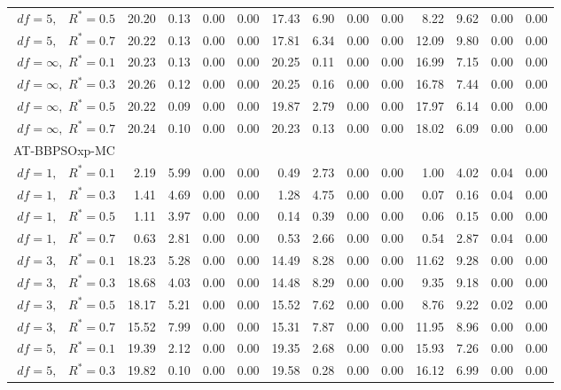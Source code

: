 \documentclass[12pt]{article}
\begin{document}
\begin{table}[ht]
{\begin{tabular}{r|rrrr|rrrr|rrrr}
  $df = 5,\enspace$ $R^* =0.5$ & 20.20 & 0.13 & 0.00 & 0.00 & 17.43 & 6.90 & 0.00 & 0.00 & 8.22 & 9.62 & 0.00 & 0.00 \\ 
  $df = 5,\enspace$ $R^* =0.7$ & 20.22 & 0.13 & 0.00 & 0.00 & 17.81 & 6.34 & 0.00 & 0.00 & 12.09 & 9.80 & 0.00 & 0.00 \\ 
  $df = \infty,$ $R^* =0.1$ & 20.23 & 0.13 & 0.00 & 0.00 & 20.25 & 0.11 & 0.00 & 0.00 & 16.99 & 7.15 & 0.00 & 0.00 \\ 
  $df = \infty,$ $R^* =0.3$ & 20.26 & 0.12 & 0.00 & 0.00 & 20.25 & 0.16 & 0.00 & 0.00 & 16.78 & 7.44 & 0.00 & 0.00 \\ 
  $df = \infty,$ $R^* =0.5$ & 20.22 & 0.09 & 0.00 & 0.00 & 19.87 & 2.79 & 0.00 & 0.00 & 17.97 & 6.14 & 0.00 & 0.00 \\ 
  $df = \infty,$ $R^* =0.7$ & 20.24 & 0.10 & 0.00 & 0.00 & 20.23 & 0.13 & 0.00 & 0.00 & 18.02 & 6.09 & 0.00 & 0.00 \\ 
\hline
\multicolumn{1}{l|}{AT-BBPSOxp-MC} &&&&&&&&&&&&\\
  $df = 1,\enspace$ $R^* =0.1$ & 2.19 & 5.99 & 0.00 & 0.00 & 0.49 & 2.73 & 0.00 & 0.00 & 1.00 & 4.02 & 0.04 & 0.00 \\ 
  $df = 1,\enspace$ $R^* =0.3$ & 1.41 & 4.69 & 0.00 & 0.00 & 1.28 & 4.75 & 0.00 & 0.00 & 0.07 & 0.16 & 0.04 & 0.00 \\ 
  $df = 1,\enspace$ $R^* =0.5$ & 1.11 & 3.97 & 0.00 & 0.00 & 0.14 & 0.39 & 0.00 & 0.00 & 0.06 & 0.15 & 0.00 & 0.00 \\ 
  $df = 1,\enspace$ $R^* =0.7$ & 0.63 & 2.81 & 0.00 & 0.00 & 0.53 & 2.66 & 0.00 & 0.00 & 0.54 & 2.87 & 0.04 & 0.00 \\ 
  $df = 3,\enspace$ $R^* =0.1$ & 18.23 & 5.28 & 0.00 & 0.00 & 14.49 & 8.28 & 0.00 & 0.00 & 11.62 & 9.28 & 0.00 & 0.00 \\ 
  $df = 3,\enspace$ $R^* =0.3$ & 18.68 & 4.03 & 0.00 & 0.00 & 14.48 & 8.29 & 0.00 & 0.00 & 9.35 & 9.18 & 0.00 & 0.00 \\ 
  $df = 3,\enspace$ $R^* =0.5$ & 18.17 & 5.21 & 0.00 & 0.00 & 15.52 & 7.62 & 0.00 & 0.00 & 8.76 & 9.22 & 0.02 & 0.00 \\ 
  $df = 3,\enspace$ $R^* =0.7$ & 15.52 & 7.99 & 0.00 & 0.00 & 15.31 & 7.87 & 0.00 & 0.00 & 11.95 & 8.96 & 0.00 & 0.00 \\ 
  $df = 5,\enspace$ $R^* =0.1$ & 19.39 & 2.12 & 0.00 & 0.00 & 19.35 & 2.68 & 0.00 & 0.00 & 15.93 & 7.26 & 0.00 & 0.00 \\ 
  $df = 5,\enspace$ $R^* =0.3$ & 19.82 & 0.10 & 0.00 & 0.00 & 19.58 & 0.28 & 0.00 & 0.00 & 16.12 & 6.99 & 0.00 & 0.00 \\ 

\end{tabular}}
\end{table}
\end{document}
